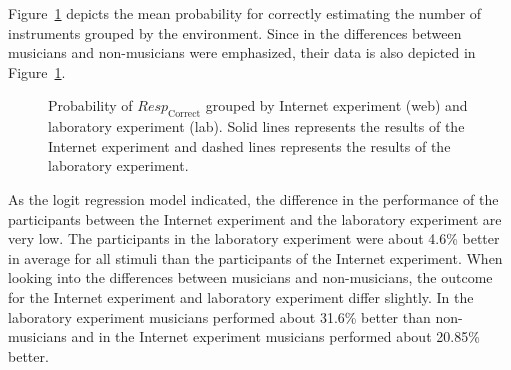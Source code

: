 Figure~\ref{figure:error_probability_iis_vs_web} depicts the mean probability for correctly estimating the number of instruments grouped by the environment. Since in \cite{Stoter2013} the differences between musicians and non-musicians were emphasized, their data is also depicted in Figure~\ref{figure:error_probability_iis_vs_web}.
\begin{figure}[t]
\centering
{}
\caption{Probability of $\textit{Resp}_{\mathrm{Correct}}$ grouped by Internet experiment (web) and laboratory experiment (lab). Solid lines represents the results of the Internet experiment and dashed lines represents the results of the laboratory experiment.}
\label{figure:error_probability_iis_vs_web}
\end{figure}
As the logit regression model indicated, the difference in the performance of the participants between the Internet experiment and the laboratory experiment are very low. The participants in the laboratory experiment were about 4.6\% better in average for all stimuli than the participants of the Internet experiment. When looking into the differences between musicians and non-musicians, the outcome for the Internet experiment and laboratory experiment differ slightly. In the laboratory experiment musicians performed about 31.6\% better than non-musicians and in the Internet experiment musicians performed about 20.85\% better.

